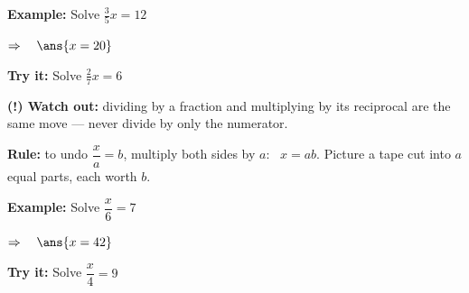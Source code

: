 \documentclass[12pt]{article}
\begin{document}
\begin{examplebox}
\textbf{Example:} \quad Solve $\tfrac{3}{5}x = 12$

$\Rightarrow\quad \ans{x = 20}$
\end{examplebox}

\begin{tryitbox}
\textbf{Try it:} \quad Solve $\tfrac{2}{7}x = 6$\\[2pt]
\end{tryitbox}

\begin{watchoutbox}
\textbf{(!) Watch out:} dividing by a fraction and multiplying by its reciprocal
are the same move --- never divide by only the numerator.
\end{watchoutbox}


\begin{formulabox}
\textbf{Rule:} to undo $\dfrac{x}{a} = b$, multiply both sides by $a$: \ $x = ab$.
Picture a tape cut into $a$ equal parts, each worth $b$.
\end{formulabox}

\begin{examplebox}
\textbf{Example:} \quad Solve $\dfrac{x}{6} = 7$

$\Rightarrow\quad \ans{x = 42}$
\end{examplebox}

\begin{tryitbox}
\textbf{Try it:} \quad Solve $\dfrac{x}{4} = 9$\\[2pt]
\end{tryitbox}
\end{document}
